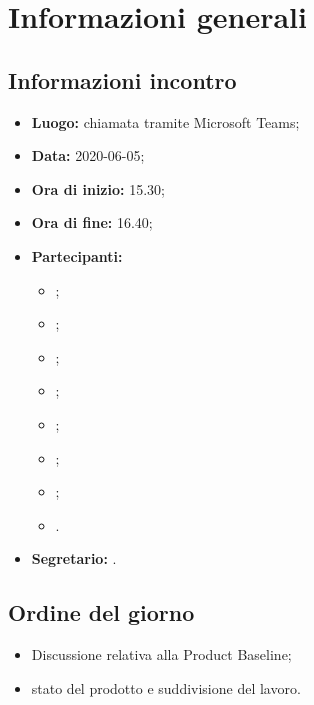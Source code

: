 \section{Informazioni generali}
\subsection{Informazioni incontro}
\begin{itemize}
	\item \textbf{Luogo:} chiamata tramite Microsoft Teams;
	\item \textbf{Data:} 2020-06-05;
	\item \textbf{Ora di inizio:} 15.30;
	\item \textbf{Ora di fine:} 16.40;
	\item \textbf{Partecipanti:}
		\begin{itemize}
			\item \VB;
			\item \LB;
			\item \NF;
			\item \EG;
			\item \FJ;
			\item \MP;
			\item \AS;
			\item \AZ.
		\end{itemize}
	\item \textbf{Segretario:} \VB.
\end{itemize}

\subsection{Ordine del giorno}
\begin{itemize}
	\item Discussione relativa alla Product Baseline;
	\item stato del prodotto e suddivisione del lavoro.
\end{itemize}
